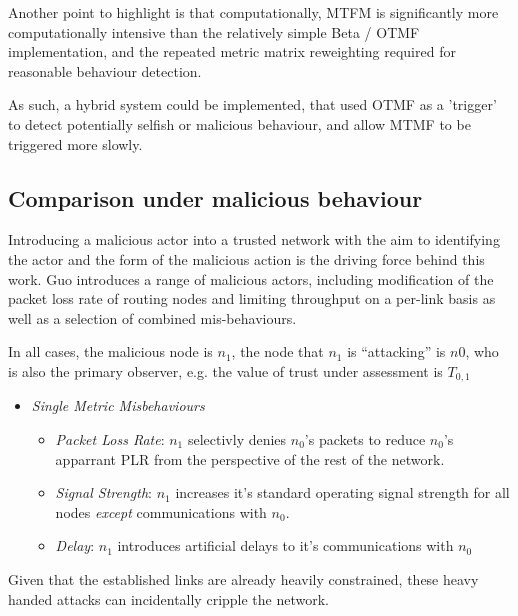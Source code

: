 \documentclass[runningheads,a4paper]{llncs}
\begin{document}
{{Another point to highlight is that computationally, MTFM is significantly more computationally intensive than the relatively simple Beta / OTMF implementation, and the repeated metric matrix reweighting required for reasonable behaviour detection.

As such, a hybrid system could be implemented, that used OTMF as a 'trigger' to detect potentially selfish or malicious behaviour, and allow MTMF to be triggered more slowly.

\subsection{Comparison under malicious behaviour}

Introducing a malicious actor into a trusted network with the aim to identifying the actor and the form of the malicious action is the driving force behind this work. 
Guo introduces a range of malicious actors, including modification of the packet loss rate of routing nodes and limiting throughput on a per-link basis as well as a selection of combined mis-behaviours. 

In all cases, the malicious node is $n_1$, the node that $n_1$ is ``attacking'' is $n0$, who is also the primary observer, e.g. the value of trust under assessment is $T_{0,1}$
\begin{itemize}
  \item \emph{Single Metric Misbehaviours}
    \begin{itemize}
      \item \emph{Packet Loss Rate}: $n_1$ selectivly denies $n_0$'s packets to reduce $n_0$'s apparrant PLR from the perspective of the rest of the network.
      \item \emph{Signal Strength}: $n_1$ increases it's standard operating signal strength for all nodes \emph{except} communications with $n_0$.
      \item \emph{Delay}: $n_1$ introduces artificial delays to it's communications with $n_0$
    \end{itemize}
\end{itemize}
Given that the established links are already heavily constrained, these heavy handed attacks can incidentally cripple the network.



}}
\end{document}
